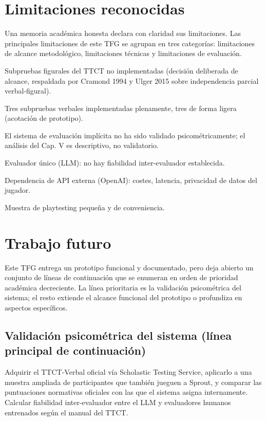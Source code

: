 \documentclass[12pt,twoside,titlepage]{report}
\begin{document}
\section{Limitaciones reconocidas}

Una memoria académica honesta declara con claridad sus limitaciones. Las principales limitaciones de este TFG se agrupan en tres categorías: limitaciones de alcance metodológico, limitaciones técnicas y limitaciones de evaluación.

Subpruebas figurales del TTCT no implementadas (decisión deliberada de alcance, respaldada por Cramond 1994 y Ulger 2015 sobre independencia parcial verbal-figural).

Tres subpruebas verbales implementadas plenamente, tres de forma ligera (acotación de prototipo).

El sistema de evaluación implícita no ha sido validado psicométricamente; el análisis del Cap. V es descriptivo, no validatorio.

Evaluador único (LLM): no hay fiabilidad inter-evaluador establecida.

Dependencia de API externa (OpenAI): costes, latencia, privacidad de datos del jugador.

Muestra de playtesting pequeña y de conveniencia.

\section{Trabajo futuro}

Este TFG entrega un prototipo funcional y documentado, pero deja abierto un conjunto de líneas de continuación que se enumeran en orden de prioridad académica decreciente. La línea prioritaria es la validación psicométrica del sistema; el resto extiende el alcance funcional del prototipo o profundiza en aspectos específicos.

\subsection{Validación psicométrica del sistema (línea principal de continuación)}

Adquirir el TTCT-Verbal oficial vía Scholastic Testing Service, aplicarlo a una muestra ampliada de participantes que también jueguen a Sprout, y comparar las puntuaciones normativas oficiales con las que el sistema asigna internamente. Calcular fiabilidad inter-evaluador entre el LLM y evaluadores humanos entrenados según el manual del TTCT.
\end{document}
